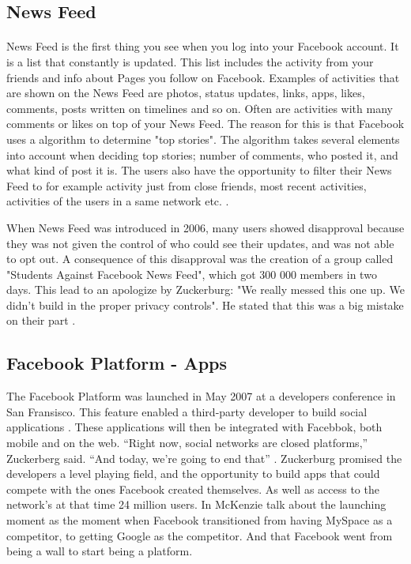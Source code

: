 \subsection{News Feed}
\paragraph{}
News Feed is the first thing you see when you log into your Facebook account. It is a list that constantly is updated. This list includes the activity from your friends and info about Pages you follow on Facebook. Examples of activities that are shown on the News Feed are photos, status updates, links, apps, likes, comments, posts written on timelines and so on. Often are activities with many comments or likes on top of your News Feed. The reason for this is that Facebook uses a algorithm to determine "top stories". The algorithm takes several elements into account when deciding top stories; number of comments, who posted it, and what kind of post it is. The users also have the opportunity to filter their News Feed to for example activity just from close friends, most recent activities, activities of the users in a same network etc. \cite{newsfeed}.

When News Feed was introduced in 2006, many users showed disapproval because they was not given the control of who could see their updates, and was not able to opt out. A consequence of this disapproval was the creation of a group called "Students Against Facebook News Feed", which got 300 000 members in two days. This lead to an apologize by Zuckerburg: "We really messed this one up. We didn't build in the proper privacy controls". He stated that this was a big mistake on their part \cite{newsfeed2}. 


\subsection{Facebook Platform - Apps}
\label{subsec:app}
The Facebook Platform was launched in May 2007 at a developers conference in San Fransisco. This feature enabled a third-party developer to build social applications \cite{BBCFacebookGrowth}. These applications will then be integrated with Facebbok, both mobile and on the web. “Right now, social networks are closed platforms,” Zuckerberg said. “And today, we’re going to end that” \cite{platformStory}. Zuckerburg promised the developers a level playing field, and the opportunity to build apps that could compete with the ones Facebook created themselves. As well as access to the network's at that time 24 million users. In \cite{platformStory} McKenzie talk about the launching moment as the moment when Facebook transitioned from having MySpace as a competitor, to getting Google as the competitor. And that Facebook went from being a wall to start being a platform. 

